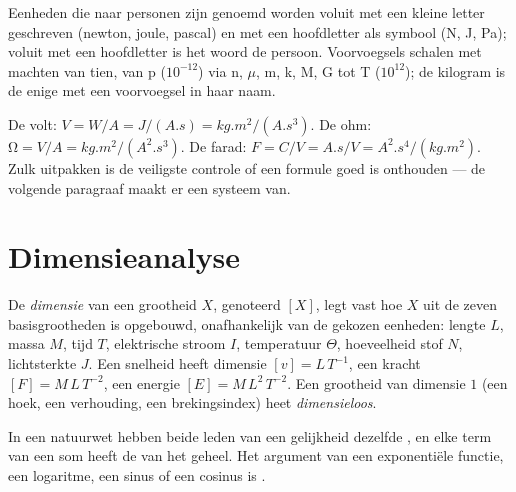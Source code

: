 \begin{remark}\label{rem:b1:units-dimensions:names}
Eenheden die naar personen zijn genoemd worden voluit met een kleine letter
geschreven (newton, joule, pascal) en met een hoofdletter als symbool
(\unit{N}, \unit{J}, \unit{Pa}); voluit met een hoofdletter is het woord de
persoon. Voorvoegsels schalen met machten van tien, van p ($10^{-12}$) via
n, $\mu$, m, k, M, G tot T
($10^{12}$); de
kilogram is de enige  met een voorvoegsel in haar naam.
\end{remark}

\begin{example}\label{ex:b1:units-dimensions:unpack}
De volt: $\unit{V} = \unit{W/A} = \unit{J/(A.s)} = \unit{kg.m^2/(A.s^3)}$.
De ohm: $\unit{\ohm} = \unit{V/A} = \unit{kg.m^2/(A^2.s^3)}$. De farad:
$\unit{F} = \unit{C/V} = \unit{A.s/V} = \unit{A^2.s^4/(kg.m^2)}$. Zulk
uitpakken is de veiligste controle of een formule goed is onthouden ---
de volgende paragraaf maakt er een systeem van.
\end{example}

\section{Dimensieanalyse}

\begin{definition}[Dimensie]\label{def:b1:units-dimensions:dimension}
De \emph{dimensie} van een grootheid $X$, genoteerd $[X]$, legt vast hoe $X$
uit de zeven basisgrootheden is opgebouwd, onafhankelijk van de gekozen
eenheden: lengte $L$, massa $M$, tijd $T$, elektrische stroom $I$,
temperatuur $\Theta$, hoeveelheid stof $N$, lichtsterkte $J$.
Een snelheid heeft dimensie $[v] = L\,T^{-1}$, een kracht
$[F] = M\,L\,T^{-2}$, een energie $[E] = M\,L^2\,T^{-2}$. Een grootheid van
dimensie $1$ (een hoek, een verhouding, een brekingsindex) heet
\emph{dimensieloos}.
\end{definition}

\begin{theorem}\label{thm:b1:units-dimensions:homogeneity}
In een natuurwet hebben beide leden van een gelijkheid dezelfde ,
en elke term van een som heeft de  van het geheel. Het argument van
een exponentiële functie, een logaritme, een sinus of een cosinus is .
\end{theorem}

